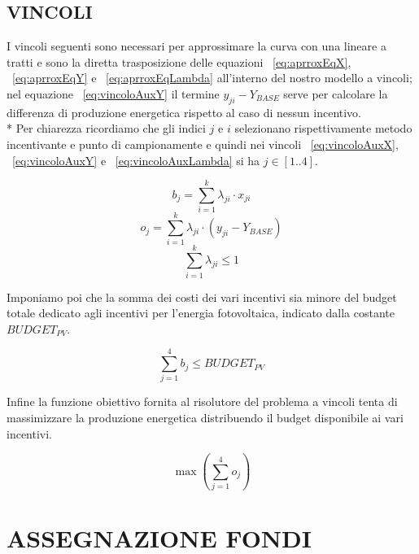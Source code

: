 \documentclass[12pt,a4paper,openright,twoside]{report}
\begin{document}
\subsection{VINCOLI}

I vincoli seguenti sono necessari per approssimare la curva con una lineare a tratti e sono la diretta trasposizione delle equazioni ~\ref{eq:aprroxEqX}, ~\ref{eq:aprroxEqY} e ~\ref{eq:aprroxEqLambda} all'interno del nostro modello a vincoli; nel equazione ~\ref{eq:vincoloAuxY} il termine $y_{ji}-Y_{BASE}$ serve per calcolare la differenza di produzione energetica rispetto al caso di nessun incentivo.\\*
Per chiarezza ricordiamo che gli indici $j$ e $i$ selezionano rispettivamente metodo incentivante e punto di campionamente e quindi nei vincoli ~\ref{eq:vincoloAuxX}, ~\ref{eq:vincoloAuxY} e ~\ref{eq:vincoloAuxLambda} si ha $j \in [1..4]$.

\begin{equation} \label{eq:vincoloAuxX}
	b_j = \sum_{i=1}^k \lambda_{ji} \cdot x_{ji} 
\end{equation}
\begin{equation} \label{eq:vincoloAuxY}
	o_j = \sum_{i=1}^k \lambda_{ji} \cdot (y_{ji}-Y_{BASE})
\end{equation}
\begin{equation} \label{eq:vincoloAuxLambda}
	\sum_{i=1}^k \lambda_{ji} \leq 1
\end{equation}

Imponiamo poi che la somma dei costi dei vari incentivi sia minore del budget totale dedicato agli incentivi per l'energia fotovoltaica, indicato dalla costante $BUDGET_{PV}$.

\begin{equation} \label{eq:vincoloCosti}
	\sum_{j=1}^4 b_j \leq BUDGET_{PV}
\end{equation}

Infine la funzione obiettivo fornita al risolutore del problema a vincoli tenta di massimizzare la produzione energetica distribuendo il budget disponibile ai vari incentivi.

\begin{equation} \label{eq:vincoloCosti}
	\max ( \sum_{j=1}^4 o_j )
\end{equation}



\section{ASSEGNAZIONE FONDI}
\end{document}
